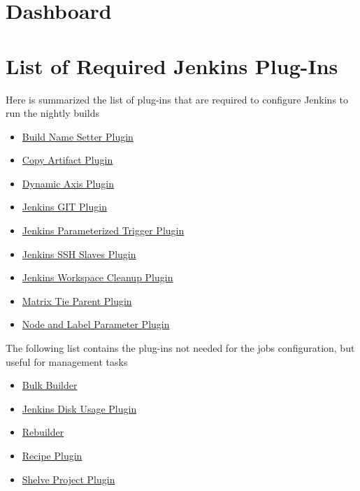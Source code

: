 \documentclass{lhcbnote}
\newcommand{\link}[2]{\href{#1}{#2}}
\begin{document}
\section{Dashboard}




%


\appendix
\section{List of Required Jenkins Plug-Ins}
\label{JenkinsPlugIns}
Here is summarized the list of plug-ins that are required to configure Jenkins
to run the nightly builds
\newcommand{\JPI}[2]{\item \link{#2}{#1}}
\begin{itemize}
  \JPI{Build Name Setter Plugin}{http://wiki.jenkins-ci.org/display/JENKINS/Build+Name+Setter+Plugin}
  \JPI{Copy Artifact Plugin}{http://wiki.jenkins-ci.org/display/JENKINS/Copy+Artifact+Plugin}
  \JPI{Dynamic Axis Plugin}{https://wiki.jenkins-ci.org/display/JENKINS/DynamicAxis+Plugin}
  \JPI{Jenkins GIT Plugin}{http://wiki.jenkins-ci.org/display/JENKINS/Git+Plugin}
  \JPI{Jenkins Parameterized Trigger Plugin}{http://wiki.jenkins-ci.org/display/JENKINS/Parameterized+Trigger+Plugin}
  \JPI{Jenkins SSH Slaves Plugin}{http://wiki.jenkins-ci.org/display/JENKINS/SSH+Slaves+plugin}
  \JPI{Jenkins Workspace Cleanup Plugin}{http://wiki.jenkins-ci.org/display/JENKINS/Workspace+Cleanup+Plugin}
  \JPI{Matrix Tie Parent Plugin}{http://wiki.hudson-ci.org/display/HUDSON/Matrix+Tie+Parent+Plugin}
  \JPI{Node and Label Parameter Plugin}{https://wiki.jenkins-ci.org/display/JENKINS/NodeLabel+Parameter+Plugin}
\end{itemize}

The following list contains the plug-ins not needed for the jobs configuration,
but useful for management tasks
\begin{itemize}
  \JPI{Bulk Builder}{http://wiki.jenkins-ci.org/display/JENKINS/Bulk+Builder+Plugin}
  \JPI{Jenkins Disk Usage Plugin}{http://wiki.jenkins-ci.org/display/JENKINS/Disk+Usage+Plugin}
  \JPI{Rebuilder}{http://wiki.jenkins-ci.org/display/JENKINS/Rebuild+Plugin}
  \JPI{Recipe Plugin}{https://wiki.jenkins-ci.org/display/JENKINS/Recipe+Plugin}
  \JPI{Shelve Project Plugin}{http://wiki.jenkins-ci.org/display/JENKINS/Shelve+Project+Plugin}
\end{itemize}
\end{document}
